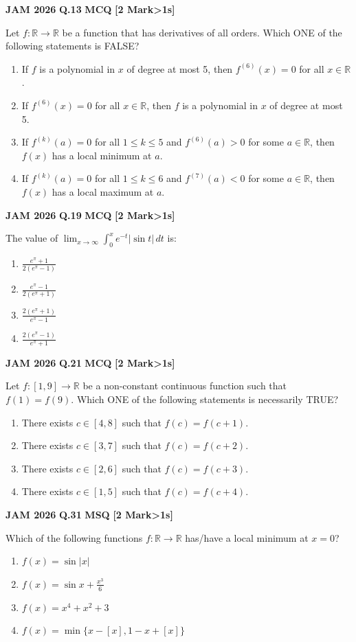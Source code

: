 \documentclass[11pt,a4paper]{article}
\newcommand{\pyqheader}[4]{%
    \noindent\begin{tcolorbox}[
        colback=badgebg,
        colframe=secondary,
        arc=2mm,
        boxrule=0.6pt,
        top=1.5mm,bottom=1.5mm,left=2mm,right=2mm
    ]
        \textbf{\textcolor{primary}{JAM #1}} \hfill \textbf{Q.#2} \hfill \textsc{\textbf{#3}} \hfill \textbf{[#4 Mark\ifnum#4>1s\fi]}
    \end{tcolorbox}\vspace{-1mm}
}
\begin{document}
\pyqheader{2026}{13}{MCQ}{2}
Let $f:\mathbb{R}\rightarrow\mathbb{R}$ be a function that has derivatives of all orders. Which ONE of the following statements is FALSE?
\begin{enumerate}[label=(\Alph*)]
    \item If $f$ is a polynomial in $x$ of degree at most 5, then $f^{(6)}(x)=0$ for all $x\in\mathbb{R}$.
    \item If $f^{(6)}(x)=0$ for all $x\in\mathbb{R}$, then $f$ is a polynomial in $x$ of degree at most 5.
    \item If $f^{(k)}(a)=0$ for all $1\le k\le 5$ and $f^{(6)}(a)>0$ for some $a\in\mathbb{R}$, then $f(x)$ has a local minimum at $a$.
    \item If $f^{(k)}(a)=0$ for all $1\le k\le 6$ and $f^{(7)}(a)<0$ for some $a\in\mathbb{R}$, then $f(x)$ has a local maximum at $a$.
\end{enumerate}

\pyqheader{2026}{19}{MCQ}{2}
The value of $\lim_{x\rightarrow\infty}\int_{0}^{x}e^{-t}|\sin t|\,dt$ is:
\begin{enumerate}[label=(\Alph*)]
    \item $\frac{e^{\pi}+1}{2(e^{\pi}-1)}$
    \item $\frac{e^{\pi}-1}{2(e^{\pi}+1)}$
    \item $\frac{2(e^{\pi}+1)}{e^{\pi}-1}$
    \item $\frac{2(e^{\pi}-1)}{e^{\pi}+1}$
\end{enumerate}

\pyqheader{2026}{21}{MCQ}{2}
Let $f:[1,9]\rightarrow\mathbb{R}$ be a non-constant continuous function such that $f(1)=f(9)$. Which ONE of the following statements is necessarily TRUE?
\begin{enumerate}[label=(\Alph*)]
    \item There exists $c\in[4,8]$ such that $f(c)=f(c+1)$.
    \item There exists $c\in[3,7]$ such that $f(c)=f(c+2)$.
    \item There exists $c\in[2,6]$ such that $f(c)=f(c+3)$.
    \item There exists $c\in[1,5]$ such that $f(c)=f(c+4)$.
\end{enumerate}

\pyqheader{2026}{31}{MSQ}{2}
Which of the following functions $f:\mathbb{R}\rightarrow\mathbb{R}$ has/have a local minimum at $x=0$?
\begin{enumerate}[label=(\Alph*)]
    \item $f(x)=\sin|x|$
    \item $f(x)=\sin x+\frac{x^{3}}{6}$
    \item $f(x)=x^{4}+x^{2}+3$
    \item $f(x)=\min\{x-[x],1-x+[x]\}$
\end{enumerate}
\end{document}
